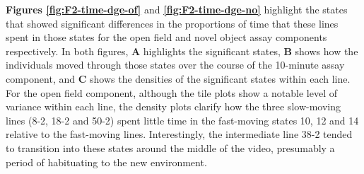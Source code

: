 \documentclass[
]{book}
\begin{document}
\textbf{Figures \ref{fig:F2-time-dge-of}} and \textbf{\ref{fig:F2-time-dge-no}} highlight the states that showed significant differences in the proportions of time that these lines spent in those states for the open field and novel object assay components respectively. In both figures, \textbf{A} highlights the significant states, \textbf{B} shows how the individuals moved through those states over the course of the 10-minute assay component, and \textbf{C} shows the densities of the significant states within each line. For the open field component, although the tile plots show a notable level of variance within each line, the density plots clarify how the three slow-moving lines (8-2, 18-2 and 50-2) spent little time in the fast-moving states 10, 12 and 14 relative to the fast-moving lines. Interestingly, the intermediate line 38-2 tended to transition into these states around the middle of the video, presumably a period of habituating to the new environment.
\end{document}
